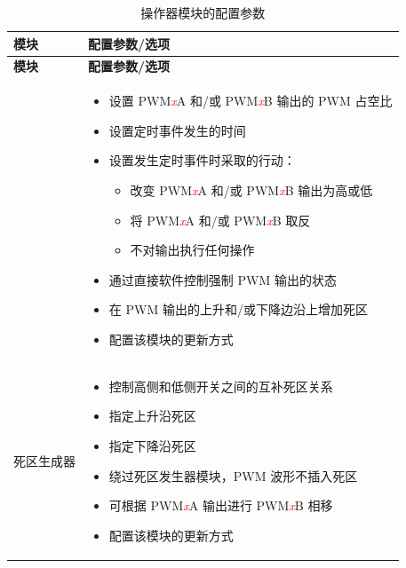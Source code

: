 \begin{longtable}[c]{|p{4cm}|p{11cm}|}
\caption{操作器模块的配置参数}
\label{tab:mcpwm-param-operator}
    \\\hline
    \rowcolor{lightgray}
 \textbf{模块} & \textbf{配置参数/选项} \\ \hline 

\endfirsthead\hline
 \rowcolor{lightgray}
 \textbf{模块} & \textbf{配置参数/选项}\\
 \hline 
\endhead
\endfoot

\multirow{10}{*}{PWM 生成器} &
    \vspace{-1em}
    \begin{itemize}
        \item 设置 PWM\textcolor{red}{\it{x}}A 和/或 PWM\textcolor{red}{\it{x}}B 输出的 PWM 占空比
        \item 设置定时事件发生的时间
        \item 设置发生定时事件时采取的行动：
        \begin{itemize}
           \item 改变 PWM\textcolor{red}{\it{x}}A 和/或 PWM\textcolor{red}{\it{x}}B 输出为高或低
           \item 将 PWM\textcolor{red}{\it{x}}A 和/或 PWM\textcolor{red}{\it{x}}B 取反
           \item 不对输出执行任何操作
        \end{itemize}
        \item 通过直接软件控制强制 PWM 输出的状态
        \item 在 PWM 输出的上升和/或下降边沿上增加死区
        \item 配置该模块的更新方式
     \vspace{-1em}\end{itemize} \\\hline
     
\multirow{7}{*}{死区生成器}  &
    \vspace{-1em}\begin{itemize}
        \item 控制高侧和低侧开关之间的互补死区关系
        \item 指定上升沿死区
        \item 指定下降沿死区
        \item 绕过死区发生器模块，PWM 波形不插入死区
        \item 可根据 PWM\textcolor{red}{\it{x}}A 输出进行 PWM\textcolor{red}{\it{x}}B 相移
        \item 配置该模块的更新方式
    \vspace{-1em}\end{itemize}\\\hline
    

\end{longtable}
